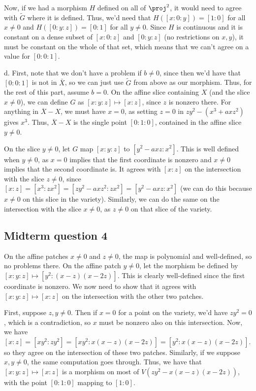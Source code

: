 \documentclass{article}
\newcommand{\conj}{\overline}
\begin{document}
Now, if we had a morphism $H$ defined on all of $\proj^2$, it would need to agree with $\tilde{G}$ where it is defined. Thus, we'd need that $H([x:0:y])=[1:0]$ for all $x\neq0$ and $H([0:y:z])=[0:1]$ for all $y\neq0$. Since $H$ is continuous and it is constant on a dense subset of $[x:0:z]$ and $[0:y:z]$ (no restrictions on $x,y$), it must be constant on the whole of that set, which means that we can't agree on a value for $[0:0:1]$.

\noindent d. First, note that we don't have a problem if $b\neq0$, since then we'd have that $[0:0:1]$ is not in $\bar{X}$, so we can just use $\tilde{G}$ from above as our morphism. Thus, for the rest of this part, assume $b=0$. On the affine slice containing $X$ (and the slice $x\neq0$), we can define $G$ as $[x:y:z]\mapsto[x:z]$, since $z$ is nonzero there. For anything in $\conj{X}-X$, we must have $x=0$, as setting $z=0$ in $zy^2-(x^3+axz^2)$ gives $x^3$. Thus, $\conj{X}-X$ is the single point $[0:1:0]$, contained in the affine slice $y\neq0$. 

On the slice $y\neq0$, let $G$ map $[x:y:z]$ to $[y^2-axz:x^2]$. This is well defined when $y\neq0$, as $x=0$ implies that the first coordinate is nonzero and $x\neq0$ implies that the second coordinate is. It agrees with $[x:z]$ on the intersection with the slice $z\neq0$, since $[x:z]=[x^3:zx^2]=[zy^2-axz^2:zx^2]=[y^2-axz:x^2]$ (we can do this because $x\neq0$ on this slice in the variety). Similarly, we can do the same on the intersection with the slice $x\neq0$, as $z\neq0$ on that slice of the variety.
\subsection*{Midterm question 4}
On the affine patches $x\neq0$ and $z\neq0$, the map is polynomial and well-defined, so no problems there. On the affine patch $y\neq0$, let the morphism be defined by $[x:y:z]\mapsto[y^2:(x-z)(x-2z)]$. This is clearly well-defined since the first coordinate is nonzero. We now need to show that it agrees with $[x:y:z]\mapsto[x:z]$ on the intersection with the other two patches. 

First, suppose $z,y\neq0$. Then if $x=0$ for a point on the variety, we'd have $zy^2=0$, which is a contradiction, so $x$ must be nonzero also on this intersection. Now, we have $[x:z]=[xy^2:zy^2]=[xy^2:x(x-z)(x-2z)]=[y^2:x(x-z)(x-2z)]$. so they agree on the intersection of these two patches. Similarly, if we suppose $x,y\neq0$, the same computation goes through. Thus, we have that $[x:y:z]\mapsto[x:z]$ is a morphism on most of $V(zy^2-x(x-z)(x-2z))$, with the point $[0:1:0]$ mapping to $[1:0]$.
\end{document}
